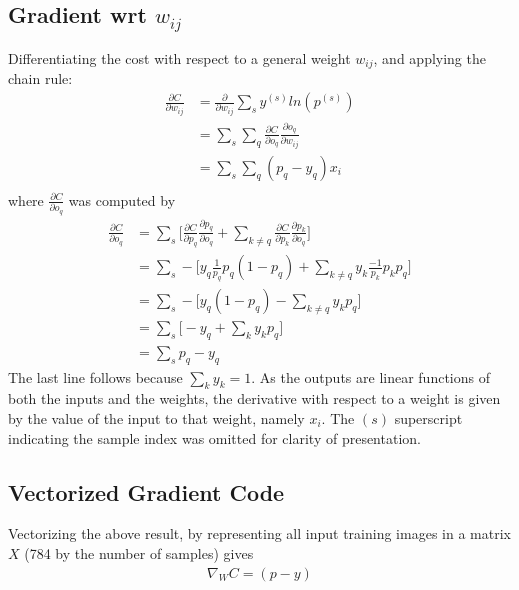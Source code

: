 \documentclass{article}
\begin{document}
   \subsection{Gradient wrt $w_{ij}$}
   Differentiating the cost with respect to a general weight $w_{ij}$, and applying
   the chain rule:
      \begin{equation*} \begin{split}
        \frac{ \partial C}{ \partial w_{ij} }
           &= \frac{ \partial }{ \partial w_{ij} } \sum_{s} y^{(s)} ln(p^{(s)}) \\
           &= \sum_s \sum_q  \frac{ \partial C}{ \partial o_q } \frac{ \partial o_q }{ \partial w_{ij} } \\
           &= \sum_s \sum_q ( p_q - y_q ) x_i \\
      \end{split} \end{equation*}
   where $ \frac{ \partial C}{ \partial o_q } $ was computed by
      \begin{equation*} \begin{split}
        \frac{ \partial C}{ \partial o_q }
           &= \sum_s \bigg[   \frac{ \partial C}{ \partial p_q } \frac{ \partial p_q}{ \partial o_q }    +   \sum_{k \neq q} \frac{ \partial C}{ \partial p_k } \frac{ \partial p_k}{ \partial o_q }  \bigg]  \\
           &= \sum_s - \bigg[    y_q \frac{1}{p_q} p_q (1 - p_q)  +   \sum_{k \neq q} y_k \frac{-1}{p_k} p_k p_q  \bigg]  \\
           &= \sum_s - \bigg[    y_q (1 - p_q)  -  \sum_{k \neq q} y_k p_q       \bigg]   \\
           &= \sum_s   \bigg[    - y_q  +  \sum_k y_k p_q   \bigg]  \\
           &= \sum_s p_q - y_q
      \end{split} \end{equation*}
   The last line follows because $\sum_k y_k = 1$.
   As the outputs are linear functions of both the inputs and the weights, the derivative
   with respect to a weight is given by the value of the input to that weight, namely $x_i$.
   The $(s)$ superscript indicating the sample index was omitted for clarity of presentation.

   \subsection{Vectorized Gradient Code}
   Vectorizing the above result, by representing all input training images in a matrix $X$
   (784 by the number of samples) gives
      \begin{equation*} \begin{split}
        \nabla_W C =  ( p - y )
      \end{split} \end{equation*}
\end{document}
